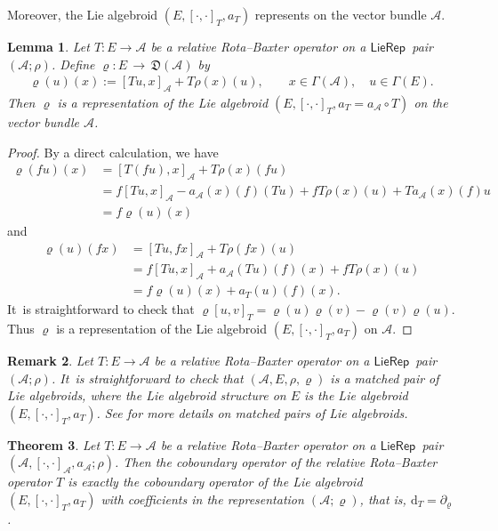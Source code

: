 \documentclass[pdftex]{sigma}%
\numberwithin{equation}{section}
\newtheorem{thm}{Theorem}[section]
\newtheorem{lem}[thm]{Lemma}
\newtheorem{rmk}[thm]{Remark}
\newcommand{\huaA}{\mathcal{A}}
\newcommand{\frkD}{\mathfrak D}
\newcommand{\lon }{\,\rightarrow\,}
\newcommand{\dM}{\mathrm{d}}
\newcommand{\LP}{$\mathsf{LieRep}$~}
\begin{document}
Moreover, the Lie algebroid $(E, [\cdot,\cdot]_{T}, a_T)$ represents on the vector bundle $\huaA$.
\begin{lem}\label{ex:MC-ten}
 Let $T\colon E\longrightarrow \huaA$ be a relative Rota--Baxter operator on a \LP pair $(\huaA;\rho)$. Define $\varrho\colon E\lon\frkD(\huaA)$ by
\begin{gather*}%
\varrho(u)(x):=[Tu,x]_{\huaA}+T\rho(x)(u),\qquad x\in\Gamma{(\huaA)},\quad u\in\Gamma{(E)}.
\end{gather*}
Then $\varrho$ is a representation of the Lie algebroid $(E,[\cdot,\cdot]_{T},a_T=a_{\huaA}\circ T)$ on the vector bundle $\huaA$.
\end{lem}
\begin{proof}
By a direct calculation, we have
\begin{align*}
\varrho(fu)(x)&=[T(fu),x]_{\huaA}+T\rho(x)(fu)\\
&=f[Tu,x]_{\huaA}-a_{\huaA}(x)(f)(Tu)+fT\rho(x)(u)+Ta_{\huaA}(x)(f)u\\
&=f\varrho(u)(x)
\end{align*}
and
\begin{align*}
\varrho(u)(fx)&=[Tu,fx]_{\huaA}+T\rho(fx)(u)\\
&=f[Tu,x]_{\huaA}+a_{\huaA}(Tu)(f)(x)+fT\rho(x)(u)\\
&=f\varrho(u)(x)+a_{T}(u)(f)(x).
\end{align*}
It~is straightforward to check that $\varrho[u,v]_T=\varrho(u)\varrho(v)-\varrho(v)\varrho(u)$. Thus $\varrho$ is a representation of the Lie algebroid $(E,[\cdot,\cdot]_{T},a_T)$ on $\huaA$.
\end{proof}

\begin{rmk}
 Let $T\colon E\longrightarrow \huaA$ be a relative Rota--Baxter operator on a \LP pair $(\huaA;\rho)$. It~is straightforward to check that $(\huaA,E,\rho,\varrho)$ is a matched pair of Lie algebroids, where the Lie algebroid structure on $E$ is the Lie algebroid $(E,[\cdot,\cdot]_{T},a_T)$. See \cite{Mok} for more details on matched pairs of Lie algebroids.
\end{rmk}


{\sloppy\begin{thm}\label{pro:coboundary operator relation}
 Let $T\colon E\longrightarrow \huaA$ be a relative Rota--Baxter operator on a \LP pair $(\huaA,[\cdot,\cdot]_\huaA,a_\huaA;\rho)$. Then the coboundary operator of the relative Rota--Baxter operator $T$ is exactly the coboundary operator of the Lie algebroid $(E, [\cdot,\cdot]_{T}, a_T)$ with coefficients in the representation $(\huaA;\varrho)$, that is,
 $\dM_T=\partial_{\varrho}$.
\end{thm}}
\end{document}
